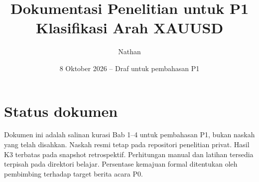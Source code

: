 \documentclass[12pt,a4paper]{report}
\title{Dokumentasi Penelitian untuk P1\\Klasifikasi Arah XAUUSD}
\author{Nathan}
\date{8 Oktober 2026 -- Draf untuk pembahasan P1}
\begin{document}
\renewcommand{\chaptername}{BAB}
\renewcommand{\contentsname}{DAFTAR ISI}
\maketitle
\chapter*{Status dokumen}
Dokumen ini adalah salinan kurasi Bab 1--4 untuk pembahasan P1, bukan naskah yang telah disahkan. Naskah resmi tetap pada repositori penelitian privat. Hasil K3 terbatas pada snapshot retrospektif. Perhitungan manual dan latihan tersedia terpisah pada direktori belajar. Persentase kemajuan formal ditentukan oleh pembimbing terhadap target berita acara P0.
\tableofcontents




\printbibliography[heading=bibintoc,title={DAFTAR REFERENSI}]
\end{document}
